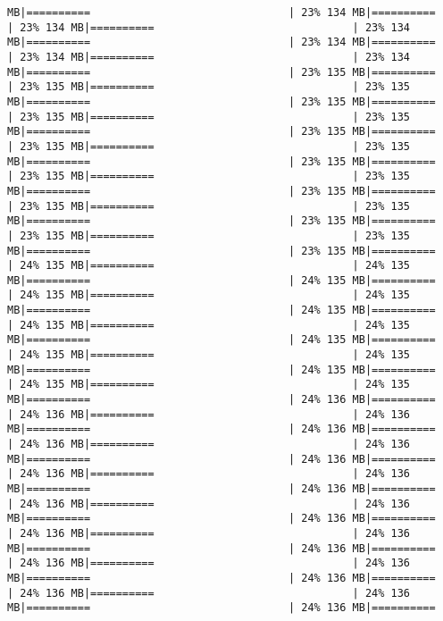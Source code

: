 \documentclass[
]{article}
\begin{document}
\begin{verbatim}
MB|==========                               | 23% 134 MB|==========                               | 23% 134 MB|==========                               | 23% 134 MB|==========                               | 23% 134 MB|==========                               | 23% 134 MB|==========                               | 23% 134 MB|==========                               | 23% 135 MB|==========                               | 23% 135 MB|==========                               | 23% 135 MB|==========                               | 23% 135 MB|==========                               | 23% 135 MB|==========                               | 23% 135 MB|==========                               | 23% 135 MB|==========                               | 23% 135 MB|==========                               | 23% 135 MB|==========                               | 23% 135 MB|==========                               | 23% 135 MB|==========                               | 23% 135 MB|==========                               | 23% 135 MB|==========                               | 23% 135 MB|==========                               | 23% 135 MB|==========                               | 23% 135 MB|==========                               | 23% 135 MB|==========                               | 23% 135 MB|==========                               | 23% 135 MB|==========                               | 24% 135 MB|==========                               | 24% 135 MB|==========                               | 24% 135 MB|==========                               | 24% 135 MB|==========                               | 24% 135 MB|==========                               | 24% 135 MB|==========                               | 24% 135 MB|==========                               | 24% 135 MB|==========                               | 24% 135 MB|==========                               | 24% 135 MB|==========                               | 24% 135 MB|==========                               | 24% 135 MB|==========                               | 24% 135 MB|==========                               | 24% 135 MB|==========                               | 24% 136 MB|==========                               | 24% 136 MB|==========                               | 24% 136 MB|==========                               | 24% 136 MB|==========                               | 24% 136 MB|==========                               | 24% 136 MB|==========                               | 24% 136 MB|==========                               | 24% 136 MB|==========                               | 24% 136 MB|==========                               | 24% 136 MB|==========                               | 24% 136 MB|==========                               | 24% 136 MB|==========                               | 24% 136 MB|==========                               | 24% 136 MB|==========                               | 24% 136 MB|==========                               | 24% 136 MB|==========                               | 24% 136 MB|==========                               | 24% 136 MB|==========                               | 24% 136 MB|==========                               | 24% 136 MB|==========                               | 24% 136 MB|==========                               | 24% 136 MB|==========            
\end{verbatim}
\end{document}
